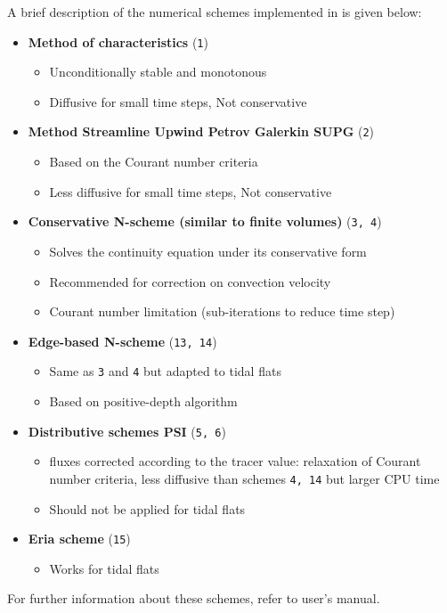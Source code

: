 A brief description of the numerical schemes implemented in \sisyphe{} is given below:
\begin{itemize}
\item \textbf{Method of characteristics} (\texttt{1}) 
\begin{itemize}
\item Unconditionally stable and monotonous
\item Diffusive for small time steps, Not conservative
\end{itemize}
\item \textbf{Method Streamline Upwind Petrov Galerkin SUPG} (\texttt{2}) 
\begin{itemize}
\item Based on the Courant number criteria
\item Less diffusive for small time steps, Not conservative
\end{itemize}
\item \textbf{Conservative N-scheme (similar to finite volumes)} (\texttt{3, 4})
\begin{itemize}
\item Solves the continuity equation under its conservative form
\item Recommended for correction on convection velocity 
\item Courant number limitation (sub-iterations to reduce time step)
\end{itemize}
\item \textbf{Edge-based N-scheme} (\texttt{13, 14})
\begin{itemize}
\item Same as \texttt{3} and \texttt{4} but adapted to tidal flats
\item Based on positive-depth algorithm 
\end{itemize}
\item \textbf{Distributive schemes PSI} (\texttt{5, 6}) 
\begin{itemize}
\item fluxes corrected according to the tracer value: relaxation of Courant number criteria, less diffusive than
schemes \texttt{4, 14} but larger CPU time
\item Should not be applied for tidal flats
\end{itemize}
\item \textbf{Eria scheme} (\texttt{15})
\begin{itemize}
\item Works for tidal flats
\end{itemize}  
\end{itemize}
For further information about these schemes, refer to  user's manual.

